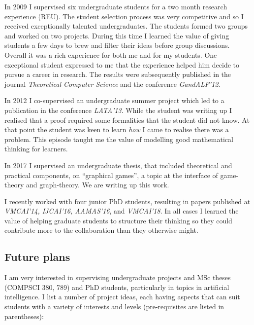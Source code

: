 \documentclass[10,a4paper,sans]{moderncv}
\begin{document}

In 2009 I supervised six undergraduate students for a two month research experience (REU). The student selection process was very competitive and so I received exceptionally talented undergraduates. The students formed two groups and worked on two projects. During this time I learned the value of giving students a few days to brew and filter their ideas before group discussions. Overall it was a rich experience for both me and for my students. One exceptional student expressed to me that the experience helped him decide to pursue a career in research. The results were subsequently published in the journal {\em Theoretical Computer Science} and the conference {\em GandALF'12}. 

In 2012 I co-supervised an undergraduate summer project which led to a publication in the conference {\em LATA'13}.  While the student was writing up I realised that a proof required some formalities that the student did not know. At that point the student was keen to learn {\em how} I came to realise there was a problem. This episode taught me the value of modelling good mathematical thinking for learners. %

In 2017 I supervised an undergraduate thesis, that included theoretical and practical components, on ``graphical games'', a topic at the interface of game-theory and graph-theory. We are writing up this work.

I recently worked with four junior PhD students, resulting in papers published at \textit{VMCAI'14, IJCAI'16, AAMAS'16}, and \textit{VMCAI'18}. In all cases I learned the value of 
helping graduate students to structure their thinking so they could contribute more to the collaboration than they otherwise might.

\subsection{Future plans}

I am very interested in supervising undergraduate projects and MSc theses (COMPSCI 380, 789) and PhD students, particularly in topics in artificial intelligence. 
I list a number of project ideas, each having aspects that can suit students with a variety of interests and levels (pre-requisites are listed in parentheses):
\end{document}

